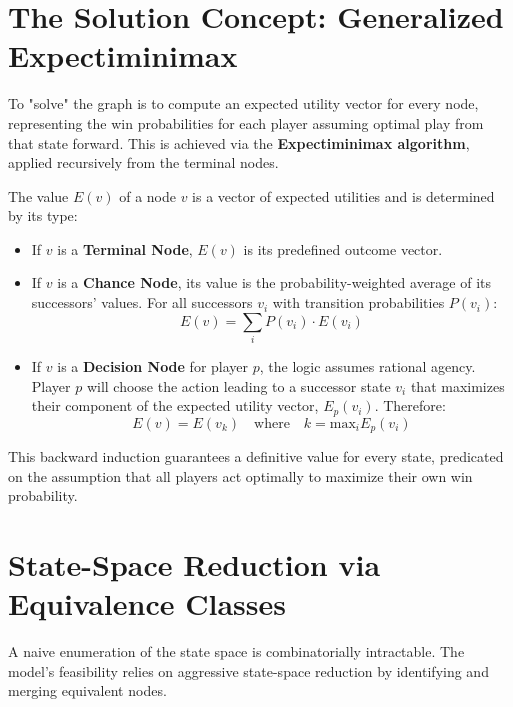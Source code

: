 \documentclass{article}
\begin{document}
\section{The Solution Concept: Generalized Expectiminimax}

To "solve" the graph is to compute an expected utility vector for every node, representing the win probabilities for each player assuming optimal play from that state forward. This is achieved via the \textbf{Expectiminimax algorithm}, applied recursively from the terminal nodes.

The value $E(v)$ of a node $v$ is a vector of expected utilities and is determined by its type:

\begin{itemize}
    \item If $v$ is a \textbf{Terminal Node}, $E(v)$ is its predefined outcome vector.

    \item If $v$ is a \textbf{Chance Node}, its value is the probability-weighted average of its successors' values. For all successors $v_i$ with transition probabilities $P(v_i)$:
    \begin{equation}
        E(v) = \sum_{i} P(v_i) \cdot E(v_i)
    \end{equation}

    \item If $v$ is a \textbf{Decision Node} for player $p$, the logic assumes rational agency. Player $p$ will choose the action leading to a successor state $v_i$ that maximizes their component of the expected utility vector, $E_p(v_i)$. Therefore:
    \begin{equation}
        E(v) = E(v_k) \quad \text{where} \quad k = \text{max}_{i} E_p(v_i)
    \end{equation}
\end{itemize}
This backward induction guarantees a definitive value for every state, predicated on the assumption that all players act optimally to maximize their own win probability.

\section{State-Space Reduction via Equivalence Classes}

A naive enumeration of the state space is combinatorially intractable. The model's feasibility relies on aggressive state-space reduction by identifying and merging equivalent nodes.
\end{document}
